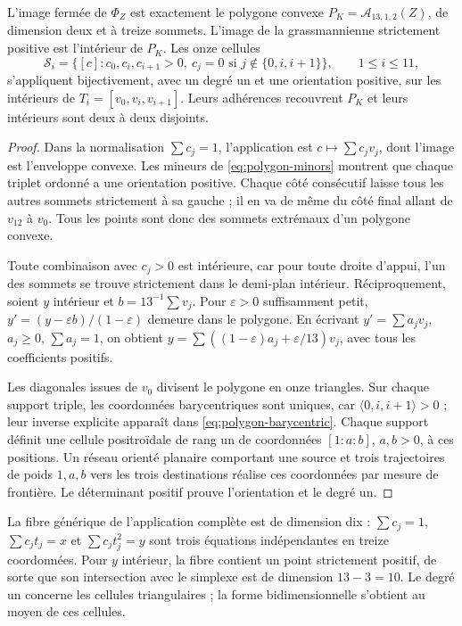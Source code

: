 \begin{theorem}
\label{thm:polygon-amplituhedron}
L’image fermée de \(\Phi_Z\) est exactement le polygone convexe
\(P_K=\mathcal A_{13,1,2}(Z)\), de dimension deux et à treize sommets. L’image
de la grassmannienne strictement positive est l’intérieur de \(P_K\).
Les onze cellules
\begin{equation}
 \mathcal S_i=\{[c]:c_0,c_i,c_{i+1}>0,\
 c_j=0\text{ si }j\notin\{0,i,i+1\}\},\qquad 1\leq i\leq11,
 \label{eq:polygon-cells}
\end{equation}
s'appliquent bijectivement, avec un degré un et une orientation positive, sur les intérieurs de \(T_i=[v_0,v_i,v_{i+1}]\). Leurs adhérences recouvrent \(P_K\) et leurs intérieurs sont deux à deux disjoints.
\end{theorem}
\begin{proof}
Dans la normalisation \(\sum c_j=1\), l’application est
\(c\mapsto\sum c_jv_j\), dont l’image est l’enveloppe convexe. Les mineurs
de \eqref{eq:polygon-minors} montrent que chaque triplet ordonné a une
orientation positive. Chaque côté consécutif laisse tous les autres sommets
strictement à sa gauche ; il en va de même du côté final allant de \(v_{12}\)
à \(v_0\). Tous les points sont donc des sommets extrémaux d’un polygone
convexe.

Toute combinaison avec \(c_j>0\) est intérieure, car pour toute droite
d’appui, l’un des sommets se trouve strictement dans le demi-plan
intérieur. Réciproquement, soient \(y\) intérieur et
\(b=13^{-1}\sum v_j\). Pour \(\varepsilon>0\) suffisamment petit,
\(y'=(y-\varepsilon b)/(1-\varepsilon)\) demeure dans le polygone.
En écrivant \(y'=\sum a_jv_j\), \(a_j\geq0\), \(\sum a_j=1\), on obtient
\(y=\sum((1-\varepsilon)a_j+\varepsilon/13)v_j\), avec tous les
coefficients positifs.

Les diagonales issues de \(v_0\) divisent le polygone en onze triangles. Sur chaque support triple, les coordonnées barycentriques sont uniques, car \(\langle0,i,i+1\rangle>0\) ; leur inverse explicite apparaît dans \eqref{eq:polygon-barycentric}. Chaque support définit une cellule positroïdale de rang un de coordonnées \([1:a:b]\), \(a,b>0\), à ces positions. Un réseau orienté planaire comportant une source et trois trajectoires de poids \(1,a,b\) vers les trois destinations réalise ces coordonnées par mesure de frontière. Le déterminant positif prouve l'orientation et le degré un.
\end{proof}

La fibre générique de l’application complète est de dimension dix :
\(\sum c_j=1\), \(\sum c_jt_j=x\) et \(\sum c_jt_j^2=y\) sont trois
équations indépendantes en treize coordonnées. Pour \(y\) intérieur, la
fibre contient un point strictement positif, de sorte que son intersection
avec le simplexe est de dimension \(13-3=10\). Le degré un concerne les
cellules triangulaires ; la forme bidimensionnelle s’obtient au moyen de ces
cellules.

